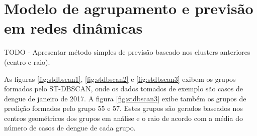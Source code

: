 \chapter{Modelo de agrupamento e previsão em redes dinâmicas}
\label{chap:modelo-agrupamento}

TODO - Apresentar método simples de previsão baseado nos clusters anteriores (centro e raio).

As figuras \ref{fig:stdbscan1}, \ref{fig:stdbscan2} e \ref{fig:stdbscan3} exibem os grupos formados pelo ST-DBSCAN, onde os dados tomados de exemplo são casos de dengue de janeiro de 2017.
A figura \ref{fig:stdbscan3} exibe também os grupos de predição formados pelo grupo 55 e 57. Estes grupos são gerados baseados nos centros geométricos dos grupos em análise e o raio de acordo com a média do número de casos de dengue de cada grupo.

\begin{figure}[!ht]
	\centering	
\end{figure}
\FloatBarrier

\begin{figure}[!ht]
	\centering	
\end{figure}
\FloatBarrier

